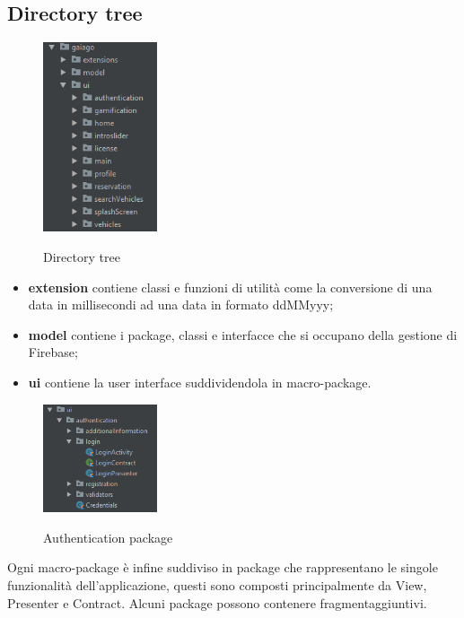 \subsection{Directory tree}
\begin{figure}[H]
	\centering
	\includegraphics[width=0.3\textwidth]
	{res/images/directorytree.png}\\
	\caption{Directory tree}
	\label{Directory Tree}
\end{figure}
\begin{itemize}
	\item \textbf{extension} contiene classi e funzioni di utilità come la conversione di una data in millisecondi ad una data in formato ddMMyyy;
	\item \textbf{model} contiene i package, classi e interfacce che si occupano della gestione di Firebase;
	\item \textbf{ui} contiene la user interface suddividendola in macro-package.
\end{itemize}
\begin{figure}[H]
	\centering
	\includegraphics[width=0.3\textwidth]
	{res/images/authentication.png}\\
	\caption{Authentication package}
	\label{Authentication package}
\end{figure}
Ogni macro-package è infine suddiviso in package che rappresentano le singole funzionalità dell'applicazione, questi sono composti principalmente da View, Presenter e Contract. Alcuni package possono contenere fragment\glosp aggiuntivi.